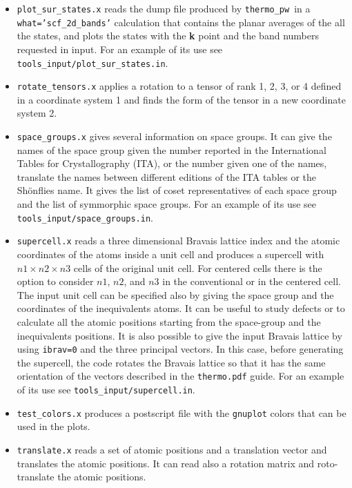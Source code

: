 \documentclass[12pt,a4paper]{article}
\def\thermo{\texttt{thermo\_pw}}
\begin{document}
\begin{itemize}
\item \texttt{plot\_sur\_states.x} reads the dump file produced
by \thermo\ in a \texttt{what='scf\_2d\_bands'} calculation that
contains the planar averages of the all the states, and plots
the states with the {\bf k} point and the band numbers requested in input.
For an example of its use see \texttt{tools\_input/plot\_sur\_states.in}.

\item \texttt{rotate\_tensors.x} applies a rotation to a tensor
of rank 1, 2, 3, or 4 defined in a coordinate system 1 and finds the form
of the tensor in a new coordinate system 2. 

\item \texttt{space\_groups.x} gives several information on space groups.
It can give the names of the space group given the number reported in
the International Tables for Crystallography (ITA), or
the number given one of the names, translate the names between different
editions of the ITA tables or the Sh\"onflies name. It gives the list 
of coset representatives of each space group and the list of symmorphic 
space groups.
For an example of its use see \texttt{tools\_input/space\_groups.in}.

\item \texttt{supercell.x} reads a three dimensional
Bravais lattice index and the atomic coordinates of the atoms inside a unit
cell and produces a supercell with $n1 \times n2 \times n3$ cells of the original
unit cell. For centered cells there is the option to consider $n1$, $n2$,
and $n3$ in the conventional or in the centered cell.
The input unit cell can be specified also by giving the space group and
the coordinates of the inequivalents atoms.
It can be useful to study defects or to calculate all the 
atomic positions starting from the space-group and the 
inequivalents positions.
It is also possible to give the input Bravais lattice by using
\texttt{ibrav=0} and the three principal vectors. In this case,
before generating the supercell, the code rotates the Bravais
lattice so that it has the same orientation of the vectors described
in the \texttt{thermo.pdf} guide.
For an example of its use see \texttt{tools\_input/supercell.in}.

\item \texttt{test\_colors.x} produces a postscript file with the 
\texttt{gnuplot} colors that can be used in the plots.   

\item \texttt{translate.x} reads a set of atomic positions and a translation
vector and translates the atomic positions. It can read also a rotation matrix 
and roto-translate the atomic positions.

\end{itemize}
\end{document}
